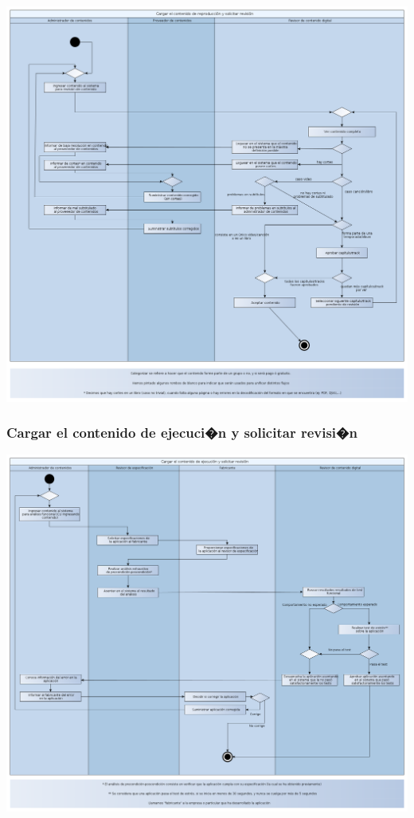 \documentclass[11pt, a4paper, spanish]{article}
\begin{document}
{	\begin{center}
		\includegraphics[scale=0.37]{Diagramas/04-CargarElContenidoDeReproduccionYSolicitarRevisionDA.png}
	\end{center}

\newpage

\subsubsection{Cargar el contenido de ejecuci�n y solicitar revisi�n}

	\begin{center}
		\includegraphics[scale=0.37]{Diagramas/05-CargarElContenidoDeEjecucionYSolicitarRevisionDA.png}
	\end{center}

}
\end{document}
